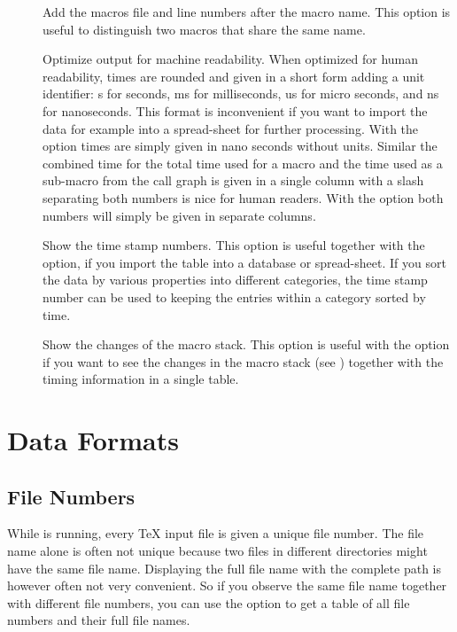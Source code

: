 \documentclass[a4paper,english]{article}
\begin{document}
\begin{description}
\item[]
  Add the macros file and line numbers after the macro name.
  This option is useful to distinguish two macros that share
  the same name.
\item[]
  Optimize output for machine readability. When optimized for human readability,
  times are rounded and given in a short form adding a unit identifier:
  s for seconds, ms for milliseconds, us for micro seconds, and ns for
  nanoseconds. This format is inconvenient if you want to import the data
  for example into a spread-sheet for further processing.
  With the  option times are simply given in nano seconds without units.
  Similar the combined time for the total time used for a macro and the
  time used as a sub-macro from the call graph is given in a single column
  with a slash separating both numbers is nice for human readers.
  With the  option both numbers will simply be given in separate columns.
  
\item[]
  Show the time stamp numbers. This option is useful together with
  the  option, if you import the table into a database or spread-sheet.
  If you sort the data by various properties into different
  categories, the time stamp number can be used to keeping the entries
  within a category sorted by time.
  
\item[]
  Show the changes of the macro stack.
  This option is useful with the  option if you want to see the changes
  in the macro stack (see ) together with the timing information in
  a single table.
\end{description}


\section{Data Formats}
\subsection{File Numbers}
While  is running, every TeX input file is given a
unique file number. The file name alone is often not unique because
two files in different directories might have the same file
name. Displaying the full file name with the complete path is however often
not very
convenient. So if you observe the same file name together with
different file numbers, you can use the option  to get a table of all
file numbers and their full file names.
\end{document}
